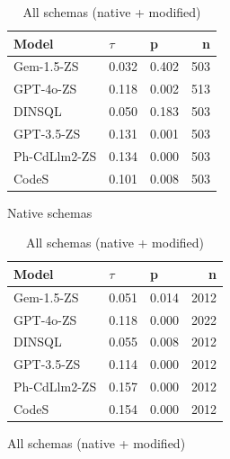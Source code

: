 \begin{table}
  \centering
  \caption{Kendall-Tau ($\tau$) Correlations between \emph{Regular Identifier Proportion} and \emph{Execution Accuracy}.}

  \begin{subfigure}{.5\linewidth}
      \centering
      \caption{Native schemas}
      \begin{tabular}{lllr}
\toprule
Model & $\tau$ & p & n \\
\midrule
Gem-1.5-ZS & 0.032 & 0.402 & 503 \\
GPT-4o-ZS & 0.118 & 0.002 & 513 \\
DINSQL & 0.050 & 0.183 & 503 \\
GPT-3.5-ZS & 0.131 & 0.001 & 503 \\
Ph-CdLlm2-ZS & 0.134 & 0.000 & 503 \\
CodeS & 0.101 & 0.008 & 503 \\
\bottomrule
\end{tabular}

      \label{table:nathigh-manual-match-ktau-native}
  \end{subfigure}%
  \begin{subfigure}{.5\linewidth}
      \centering
      \caption{All schemas (native + modified)}
      \begin{tabular}{lllr}
\toprule
Model & $\tau$ & p & n \\
\midrule
Gem-1.5-ZS & 0.051 & 0.014 & 2012 \\
GPT-4o-ZS & 0.118 & 0.000 & 2022 \\
DINSQL & 0.055 & 0.008 & 2012 \\
GPT-3.5-ZS & 0.114 & 0.000 & 2012 \\
Ph-CdLlm2-ZS & 0.157 & 0.000 & 2012 \\
CodeS & 0.154 & 0.000 & 2012 \\
\bottomrule
\end{tabular}

      \label{table:nathigh-manual-match-ktau-all}
  \end{subfigure}
\end{table}

